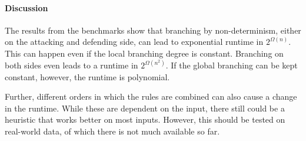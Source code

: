 \paragraph{Discussion}

The results from the benchmarks show that branching by non-determinism,
either on the attacking and defending side, can lead to exponential runtime
in $2^{\mathcal Ω(n)}$.
This can happen even if the local branching degree is constant.
Branching on both sides even leads to a runtime in $2^{\mathcal Ω(n^2)}$.
If the global branching can be kept constant, however, the runtime is
polynomial.

Further, different orders in which the rules are combined can also cause
a change in the runtime. While these are dependent on the input,
there still could be a heuristic that works better on most inputs.
However, this should be tested on real-world data, of which there is not
much available so far.

